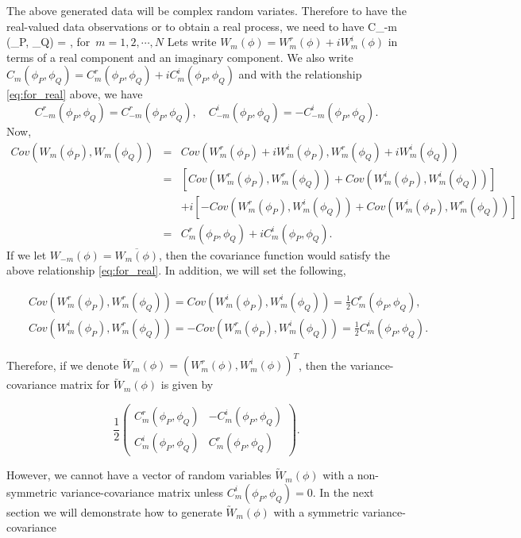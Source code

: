 	The above generated data will be complex random variates. Therefore to have the real-valued data observations or to obtain a real process, we need to have
	\beq \label{eq:for_real}
	C_{-m} (\phi_P, \phi_Q) = , \quad \mbox{for $m = 1, 2, \cdots, N$}
	\eeq
	Lets write $W_m(\phi) = W_{m}^{r}(\phi) + i W_{m}^i(\phi)$ in terms of a real component and an imaginary component. We also write $C_m(\phi_P, \phi_Q) = C_m^r(\phi_P, \phi_Q) + i C_m^i(\phi_P, \phi_Q)$
	and with the relationship \ref{eq:for_real} above, we have
	\[
		C_{-m}^r(\phi_P, \phi_Q) = C_{-m}^r(\phi_P, \phi_Q), \quad C_{-m}^i(\phi_P, \phi_Q) = - C_{-m}^i(\phi_P, \phi_Q).
	\]
	Now,
	\begin{eqnarray*}
		Cov(W_m(\phi_P), {W_m(\phi_Q)}) &=& Cov(W_m^r(\phi_P) + iW_m^i(\phi_P), W_m^r(\phi_Q) + i W_m^i(\phi_Q)) \\
		&=& \left[Cov(W_m^r(\phi_P), W_m^r(\phi_Q)) + Cov(W_m^i(\phi_P), W_m^i(\phi_Q))\right] \\
		& & + i\left[- Cov(W_m^r(\phi_P), W_m^i(\phi_Q)) + Cov(W_m^i(\phi_P), W_m^r(\phi_Q))\right] \\
		&=& C_m^r(\phi_P, \phi_Q) + i C_m^i(\phi_P, \phi_Q).
	\end{eqnarray*}
	If we let $W_{-m}(\phi) = \overline{W_m(\phi)}$, then the covariance function would satisfy the above relationship \ref{eq:for_real}. In addition, we will set the following,
			
	\begin{eqnarray} \label{real_cov}
		& & Cov(W_m^r(\phi_P), W_m^r(\phi_Q)) = Cov(W_m^i(\phi_P), W_m^i(\phi_Q)) = \frac{1}{2}C_m^r(\phi_P, \phi_Q) \label{real_cov},
	\end{eqnarray}
	\begin{eqnarray} \label{im_cov}
		& & Cov(W_m^i(\phi_P), W_m^r(\phi_Q)) = - Cov(W_m^r(\phi_P), W_m^i(\phi_Q)) = \frac{1}{2}C_m^i(\phi_P, \phi_Q).
	\end{eqnarray}
			
	Therefore, if we denote $\utilde{W}_m(\phi) = (W_m^r(\phi), W_m^i(\phi))^T$, then the variance-covariance matrix for $\utilde{W}_m(\phi)$ is given by
			
	\[
		\frac{1}{2}\left(\begin{array}{ll}
		C_m^r(\phi_P, \phi_Q)& -C_m^i(\phi_P, \phi_Q) \\
		C_m^i(\phi_P, \phi_Q) & C_m^r(\phi_P, \phi_Q)
		\end{array}
		\right).
	\]
			
	However, we cannot have a vector of random variables $\utilde{W}_m(\phi)$ with a non-symmetric variance-covariance matrix unless $C_m^i(\phi_P, \phi_Q) = 0$. In the next section we will demonstrate how to generate $\utilde{W}_m(\phi)$ with a symmetric variance-covariance\\
			
